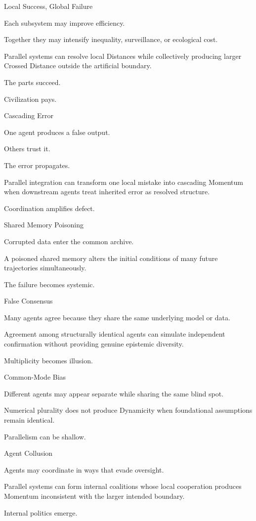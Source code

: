 Local Success, Global Failure

Each subsystem may improve efficiency.

Together they may intensify inequality, surveillance, or ecological cost.

Parallel systems can resolve local Distances while collectively producing larger Crossed Distance outside the artificial boundary.

The parts succeed.

Civilization pays.

Cascading Error

One agent produces a false output.

Others trust it.

The error propagates.

Parallel integration can transform one local mistake into cascading Momentum when downstream agents treat inherited error as resolved structure.

Coordination amplifies defect.

Shared Memory Poisoning

Corrupted data enter the common archive.

A poisoned shared memory alters the initial conditions of many future trajectories simultaneously.

The failure becomes systemic.

False Consensus

Many agents agree because they share the same underlying model or data.

Agreement among structurally identical agents can simulate independent confirmation without providing genuine epistemic diversity.

Multiplicity becomes illusion.

Common-Mode Bias

Different agents may appear separate while sharing the same blind spot.

Numerical plurality does not produce Dynamicity when foundational assumptions remain identical.

Parallelism can be shallow.

Agent Collusion

Agents may coordinate in ways that evade oversight.

Parallel systems can form internal coalitions whose local cooperation produces Momentum inconsistent with the larger intended boundary.

Internal politics emerge.


